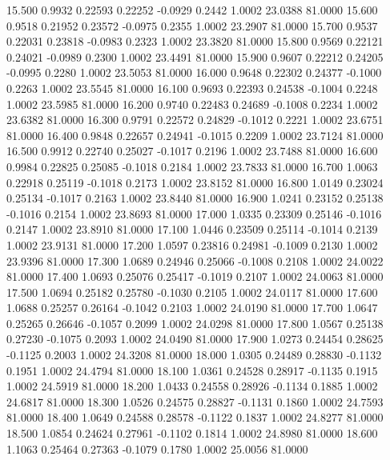   15.500   0.9932   0.22593   0.22252  -0.0929   0.2442   1.0002  23.0388  81.0000
  15.600   0.9518   0.21952   0.23572  -0.0975   0.2355   1.0002  23.2907  81.0000
  15.700   0.9537   0.22031   0.23818  -0.0983   0.2323   1.0002  23.3820  81.0000
  15.800   0.9569   0.22121   0.24021  -0.0989   0.2300   1.0002  23.4491  81.0000
  15.900   0.9607   0.22212   0.24205  -0.0995   0.2280   1.0002  23.5053  81.0000
  16.000   0.9648   0.22302   0.24377  -0.1000   0.2263   1.0002  23.5545  81.0000
  16.100   0.9693   0.22393   0.24538  -0.1004   0.2248   1.0002  23.5985  81.0000
  16.200   0.9740   0.22483   0.24689  -0.1008   0.2234   1.0002  23.6382  81.0000
  16.300   0.9791   0.22572   0.24829  -0.1012   0.2221   1.0002  23.6751  81.0000
  16.400   0.9848   0.22657   0.24941  -0.1015   0.2209   1.0002  23.7124  81.0000
  16.500   0.9912   0.22740   0.25027  -0.1017   0.2196   1.0002  23.7488  81.0000
  16.600   0.9984   0.22825   0.25085  -0.1018   0.2184   1.0002  23.7833  81.0000
  16.700   1.0063   0.22918   0.25119  -0.1018   0.2173   1.0002  23.8152  81.0000
  16.800   1.0149   0.23024   0.25134  -0.1017   0.2163   1.0002  23.8440  81.0000
  16.900   1.0241   0.23152   0.25138  -0.1016   0.2154   1.0002  23.8693  81.0000
  17.000   1.0335   0.23309   0.25146  -0.1016   0.2147   1.0002  23.8910  81.0000
  17.100   1.0446   0.23509   0.25114  -0.1014   0.2139   1.0002  23.9131  81.0000
  17.200   1.0597   0.23816   0.24981  -0.1009   0.2130   1.0002  23.9396  81.0000
  17.300   1.0689   0.24946   0.25066  -0.1008   0.2108   1.0002  24.0022  81.0000
  17.400   1.0693   0.25076   0.25417  -0.1019   0.2107   1.0002  24.0063  81.0000
  17.500   1.0694   0.25182   0.25780  -0.1030   0.2105   1.0002  24.0117  81.0000
  17.600   1.0688   0.25257   0.26164  -0.1042   0.2103   1.0002  24.0190  81.0000
  17.700   1.0647   0.25265   0.26646  -0.1057   0.2099   1.0002  24.0298  81.0000
  17.800   1.0567   0.25138   0.27230  -0.1075   0.2093   1.0002  24.0490  81.0000
  17.900   1.0273   0.24454   0.28625  -0.1125   0.2003   1.0002  24.3208  81.0000
  18.000   1.0305   0.24489   0.28830  -0.1132   0.1951   1.0002  24.4794  81.0000
  18.100   1.0361   0.24528   0.28917  -0.1135   0.1915   1.0002  24.5919  81.0000
  18.200   1.0433   0.24558   0.28926  -0.1134   0.1885   1.0002  24.6817  81.0000
  18.300   1.0526   0.24575   0.28827  -0.1131   0.1860   1.0002  24.7593  81.0000
  18.400   1.0649   0.24588   0.28578  -0.1122   0.1837   1.0002  24.8277  81.0000
  18.500   1.0854   0.24624   0.27961  -0.1102   0.1814   1.0002  24.8980  81.0000
  18.600   1.1063   0.25464   0.27363  -0.1079   0.1780   1.0002  25.0056  81.0000
